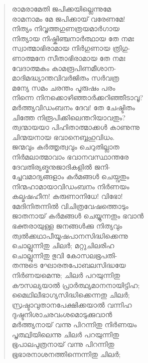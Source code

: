 \begin{verse}
രാമരാമേതി ജപിക്കയില്ലെന്നുമേ\\
രാമനാമം മേ ജപിക്കായ് വരേണമേ!\\
നിത്യം നിവൃത്തഗുണത്രയമാര്‍ഗായ\\
നിത്യായ നിഷ്കിഞ്ചനാര്‍ത്ഥായ തേ നമഃ\\
സ്വാത്മാഭിരാമായ നിര്‍ഗുണായ ത്രിഗു-\\
ണാത്മനേ സീതാഭിരാമായ തേ നമഃ\\
വേദാത്മകം കാമരൂപിണമീശാന-\\
മാദിമദ്ധ്യാന്തവിവര്‍ജിതം സര്‍വത്ര\\
മന്യേ സമം ചരന്തം പൂരുഷം പരം\\
നിന്നെ നിനക്കൊഴിഞ്ഞാര്‍ക്കറിഞ്ഞീടാവൂ?\\
മര്‍ത്ത്യവിഡംബനം ദേവ! തേ ചേഷ്ടിതം\\
ചിത്തേ നിരൂപിക്കിലെന്തറിയാവതും?\\
ത്വന്മായയാ പിഹിതാത്മാക്കള്‍ കാണുന്നു\\
ചിന്മയനായ ഭവാനെബ്ബഹുവിധം.\\
ജന്മവും കര്‍ത്തൃത്വവും ചെറുതില്ലാത\\
നിര്‍മലാത്മാവാം ഭവാനവസ്ഥാന്തരേ\\
ദേവതിര്യങ്മനുജാദികളില്‍ ജനി-\\
ച്ചേവമാദ്യങ്ങളാം കര്‍മങ്ങള്‍ ചെയ്വതും\\
നിന്മഹാമായാവിഡംബനം നിര്‍ണയം\\
കല്മഷഹീന! കരുണാനിധേ! വിഭോ!\\
മേദിനിതന്നില്‍ വിചിത്രവേഷത്തൊടും\\
ജാതനായ് കര്‍മങ്ങള്‍ ചെയ്യുന്നതും ഭവാന്‍\\
ഭക്തരായുള്ള ജനങ്ങള്‍ക്കു നിത്യവും\\
ത്വല്‍ക്കഥാപീയൂഷപാനസിദ്ധിക്കെന്നു\\
ചൊല്ലുന്നിതു ചിലര്‍; മറ്റുചിലരിഹ\\
ചൊല്ലുന്നിതു ഭുവി കോസലഭൂപതി-\\
തന്നുടെ ഘോരതപോബലസിദ്ധയേ\\
നിര്‍ണയമെന്നു; ചിലര്‍ പറയുന്നിതു\\
കൗസല്യയാല്‍ പ്രാര്‍ത്ഥ്യമാനനായിട്ടിഹ;\\
മൈഥിലീഭാഗ്യസിദ്ധിക്കെന്നതു ചിലര്‍;\\
സ്രഷ്ടാവുതാനപേക്ഷിക്കയാല്‍ വന്നിഹ\\
ദുഷ്ടനിശാചരവംശമൊടുക്കുവാന്‍\\
മര്‍ത്ത്യനായ് വന്നു പിറന്നിതു നിര്‍ണയം\\
പൃത്ഥ്വിയിലെന്നു ചിലര്‍ പറയുന്നിതു\\
ഭൂപാലപുത്രനായ് വന്നു പിറന്നിതു\\
ഭൂഭാരനാശനത്തിന്നെന്നിതു ചിലര്‍;\\

\end{verse}
